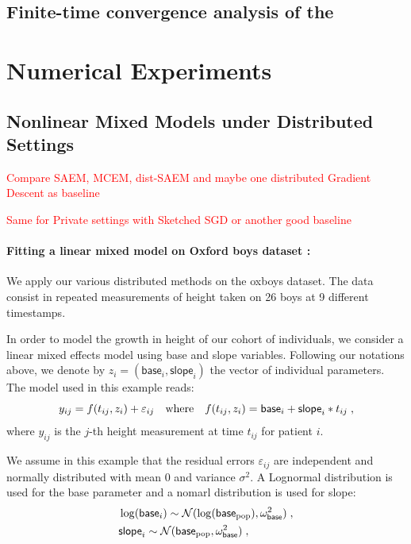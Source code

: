 \documentclass[11pt]{article}
\theoremstyle{t}
\begin{document}
\subsection{Finite-time convergence analysis of the \flSAEM}


\clearpage
\section{Numerical Experiments}


\subsection{Nonlinear Mixed Models under Distributed Settings}

\textcolor{red}{Compare SAEM, MCEM, dist-SAEM and maybe one distributed Gradient Descent as baseline}

\textcolor{red}{Same for Private settings with Sketched SGD or another good baseline}


\paragraph{Fitting a linear mixed model on Oxford boys dataset \citep{pinheiro2006mixed}:}
We apply our various distributed methods on the oxboys dataset.
The data consist in repeated measurements of height taken on 26 boys at 9 different timestamps.

In order to model the growth in height of our cohort of individuals, we consider a linear mixed effects model using \textsf{base} and \textsf{slope} variables. 
Following our notations above, we denote by $z_i = (\textsf{base}_i,\textsf{slope}_i)$ the vector of individual parameters. 
The model used in this example reads:
\begin{equation} \label{eq:pkmodel}
y_{ij} = f(t_{ij},z_i)+ \varepsilon_{ij} \quad \textrm{where} \quad f(t_{ij},z_i) = \textsf{base}_i + \textsf{slope}_i * t_{ij}\;,
\end{equation}
where $y_{ij}$ is the $j$-th height measurement at time $t_{ij}$ for patient $i$.

We assume in this example that the residual errors $\varepsilon_{ij}$ are independent and normally distributed with mean 0 and variance $\sigma^2$.
A Lognormal distribution is used for the \textsf{base} parameter and a nomarl distribution is used for \textsf{slope}:
\begin{align}
& \log(\textsf{base}_i) \sim \mathcal{N}(\log(\textsf{base}_{\rm pop}), \omega^2_{\textsf{base}} ) \;,\\
&\textsf{slope}_i \sim \mathcal{N}(\textsf{base}_{\rm pop}, \omega^2_{\textsf{base}})\;,
\end{align}
\end{document}
